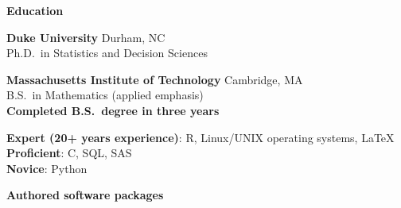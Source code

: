 \documentclass[11pt]{article}
\def\newsectn{\vspace*{0.6cm}}
\def\newitem{\vspace*{0.2cm}}
\begin{document}
\newsectn
{\Large \textbf{Education}}

\textbf{Duke University} \hfill Durham, NC\\
Ph.D.~in Statistics and Decision Sciences %

\newpage
{}



\newitem
\textbf{Massachusetts Institute of Technology} \hfill Cambridge, MA\\
B.S.~in Mathematics (applied emphasis)\\ %
\textbf{Completed B.S.~degree in three years}



\newsectn
{}

\textbf{Expert (20+ years experience)}: R, Linux/UNIX operating systems, LaTeX\\
\textbf{Proficient}: C, SQL, SAS\\
\textbf{Novice}: Python



\newsectn
\noindent \textbf{Authored software packages}
\end{document}
